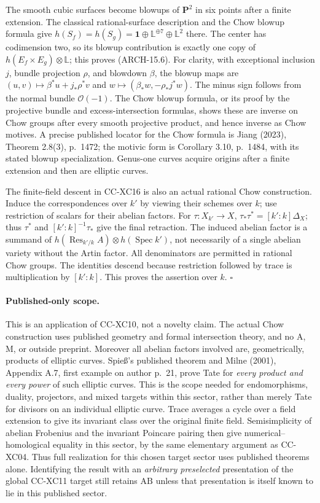 The smooth cubic surfaces become blowups of \(\mathbf P^2\) in six
points after a finite extension. The classical rational-surface
description and the Chow blowup formula give
\(h(S_f)=h(S_g)=\mathbf1\oplus\mathbb L^{\oplus7}\oplus\mathbb L^2\)
there. The center has codimension two, so its blowup contribution is
exactly one copy of \(h(E_f\times E_g)\otimes\mathbb L\); this proves
(ARCH-15.6). For clarity, with exceptional inclusion \(j\), bundle
projection \(\rho\), and blowdown \(\beta\), the blowup maps are
\((u,v)\mapsto\beta^*u+j_*\rho^*v\) and
\(w\mapsto(\beta_*w,-\rho_*j^*w)\). The minus sign follows from the
normal bundle \(\mathcal O(-1)\). The Chow blowup formula, or its
proof by the projective bundle and excess-intersection formulas, shows
these are inverse on Chow groups after every smooth projective product,
and hence inverse as Chow motives. A precise published locator for
the Chow formula is Jiang (2023), Theorem 2.8(3), p.~1472; the
motivic form is Corollary 3.10, p.~1484, with its stated blowup
specialization. Genus-one curves acquire origins
after a finite extension and then are elliptic curves.

The finite-field descent in CC-XC16 is also an actual rational Chow
construction. Induce the correspondences over \(k'\) by viewing their
schemes over \(k\); use restriction of scalars for their abelian
factors. For \(\tau:X_{k'}\to X\),
\(\tau_*\tau^*=[k':k]\Delta_X\); thus \(\tau^*\) and
\([k':k]^{-1}\tau_*\) give the final retraction. The induced abelian
factor is a summand of
\(h(\operatorname{Res}_{k'/k}A)\otimes h(\operatorname{Spec}k')\),
not necessarily of a single abelian variety without the Artin factor.
All denominators are permitted in rational Chow groups. The identities
descend because restriction followed by trace is multiplication by
\([k':k]\). This proves the assertion over \(k\). \(\square\)

\paragraph{Published-only scope.}
This is an application of CC-XC10, not a novelty claim. The actual Chow
construction uses published geometry and formal intersection theory,
and no A, M, or outside preprint. Moreover all abelian factors involved
are, geometrically, products of elliptic curves. Spie\ss's published
theorem and Milne (2001), Appendix A.7, first example on author p.~21,
prove Tate for \emph{every product and every power} of such elliptic
curves. This is the scope needed for endomorphisms, duality, projectors,
and mixed targets within this sector, rather than merely Tate for
divisors on an individual elliptic curve. Trace averages a cycle over
a field extension to give its invariant class over the original finite
field. Semisimplicity of abelian Frobenius and the invariant Poincare
pairing then give numerical--homological equality in this sector, by
the same elementary argument as CC-XC04. Thus full realization for this
chosen target sector uses published theorems alone. Identifying the
result with an \emph{arbitrary preselected} presentation of the global
CC-XC11 target still retains \(\mathrm{AB}\) unless that presentation
is itself known to lie in this published sector.

